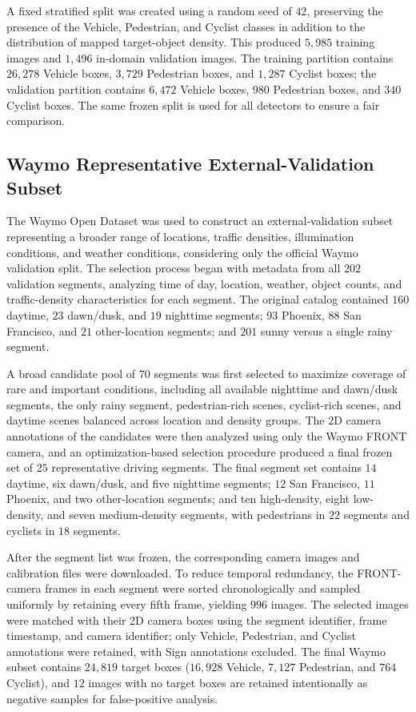 A fixed stratified split was created using a random seed of $42$, preserving the presence
of the Vehicle, Pedestrian, and Cyclist classes in addition to the distribution of mapped
target-object density. This produced $5{,}985$ training images and $1{,}496$ in-domain
validation images. The training partition contains $26{,}278$ Vehicle boxes, $3{,}729$
Pedestrian boxes, and $1{,}287$ Cyclist boxes; the validation partition contains
$6{,}472$ Vehicle boxes, $980$ Pedestrian boxes, and $340$ Cyclist boxes. The same frozen
split is used for all detectors to ensure a fair comparison.

\subsection{Waymo Representative External-Validation Subset}
\label{sec:datasets_waymo}

The Waymo Open Dataset was used to construct an external-validation subset representing a
broader range of locations, traffic densities, illumination conditions, and weather
conditions, considering only the official Waymo validation split. The selection process
began with metadata from all $202$ validation segments, analyzing time of day, location,
weather, object counts, and traffic-density characteristics for each segment. The original
catalog contained $160$ daytime, $23$ dawn/dusk, and $19$ nighttime segments; $93$
Phoenix, $88$ San Francisco, and $21$ other-location segments; and $201$ sunny versus a
single rainy segment.

A broad candidate pool of $70$ segments was first selected to maximize coverage of rare
and important conditions, including all available nighttime and dawn/dusk segments, the
only rainy segment, pedestrian-rich scenes, cyclist-rich scenes, and daytime scenes
balanced across location and density groups. The 2D camera annotations of the candidates
were then analyzed using only the Waymo FRONT camera, and an optimization-based selection
procedure produced a final frozen set of $25$ representative driving segments. The final
segment set contains $14$ daytime, six dawn/dusk, and five nighttime segments; $12$ San
Francisco, $11$ Phoenix, and two other-location segments; and ten high-density, eight
low-density, and seven medium-density segments, with pedestrians in $22$ segments and
cyclists in $18$ segments.

After the segment list was frozen, the corresponding camera images and calibration files
were downloaded. To reduce temporal redundancy, the FRONT-camera frames in each segment
were sorted chronologically and sampled uniformly by retaining every fifth frame, yielding
$996$ images. The selected images were matched with their 2D camera boxes using the
segment identifier, frame timestamp, and camera identifier; only Vehicle, Pedestrian, and
Cyclist annotations were retained, with Sign annotations excluded. The final Waymo subset
contains $24{,}819$ target boxes ($16{,}928$ Vehicle, $7{,}127$ Pedestrian, and $764$
Cyclist), and $12$ images with no target boxes are retained intentionally as negative
samples for false-positive analysis.

